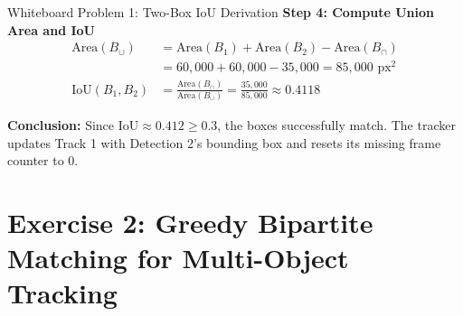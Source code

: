 \begin{interviewq}{Whiteboard Problem 1: Two-Box IoU Derivation}
\textbf{Step 4: Compute Union Area and IoU}
\begin{align*}
\text{Area}(B_{\cup}) &= \text{Area}(B_1) + \text{Area}(B_2) - \text{Area}(B_{\cap}) \\
&= 60{,}000 + 60{,}000 - 35{,}000 = 85{,}000 \text{ px}^2 \\[6pt]
\text{IoU}(B_1, B_2) &= \frac{\text{Area}(B_{\cap})}{\text{Area}(B_{\cup})} = \frac{35{,}000}{85{,}000} \approx \mathbf{0.4118}
\end{align*}

\textbf{Conclusion:} Since $\text{IoU} \approx 0.412 \ge 0.3$, the boxes successfully match. The tracker updates Track 1 with Detection 2's bounding box and resets its missing frame counter to 0.
\end{interviewq}

\section{Exercise 2: Greedy Bipartite Matching for Multi-Object Tracking}
\label{sec:wb_matching}


